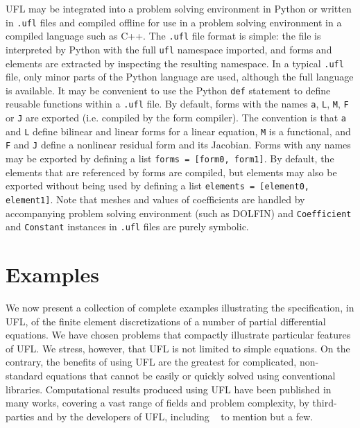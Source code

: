 \documentclass[prodmode,acmtoms]{acmsmall}
\newcommand{\uflc}[1]{\texttt{#1}}
\begin{document}
UFL may be integrated into a problem solving environment in Python or
written in \uflc{.ufl} files and compiled offline for use in a problem
solving environment in a compiled language such as C++.  The
\uflc{.ufl} file format is simple: the file is interpreted by Python
with the full \uflc{ufl} namespace imported, and forms and elements
are extracted by inspecting the resulting namespace.  In a typical
\uflc{.ufl} file, only minor parts of the Python language are used,
although the full language is available. It may be convenient to use
the Python \uflc{def} statement to define reusable functions within a
\uflc{.ufl} file. By default, forms with the names \uflc{a}, \uflc{L},
\uflc{M}, \uflc{F} or \uflc{J} are exported (i.e. compiled by the form
compiler).  The convention is that \uflc{a} and \uflc{L} define
bilinear and linear forms for a linear equation, \uflc{M} is a
functional, and \uflc{F} and \uflc{J} define a nonlinear residual form
and its Jacobian. Forms with any names may be exported by defining a
list \uflc{forms = [form0, form1]}. By default, the elements that are
referenced by forms are compiled, but elements may also be exported
without being used by defining a list \uflc{elements = [element0,
    element1]}.  Note that meshes and values of coefficients are
handled by accompanying problem solving environment (such as DOLFIN)
and \uflc{Coefficient} and \uflc{Constant} instances in \uflc{.ufl}
files are purely symbolic.

\section{Examples}
\label{sec:examples}

We now present a collection of complete examples illustrating the
specification, in UFL, of the finite element discretizations of a
number of partial differential equations. We have chosen problems that
compactly illustrate particular features of UFL. We stress, however,
that UFL is not limited to simple equations. On the contrary, the
benefits of using UFL are the greatest for complicated, non-standard
equations that cannot be easily or quickly solved using conventional
libraries. Computational results produced using UFL have been
published in many works, covering a vast range of fields and problem
complexity, by third-parties and by the developers of UFL, including
~\citep{abert2012numerical,arnold2012consistency,brandenburg2012advanced,brunner2012deterministic,FunkeFarrell2013,hake2012modelling,labeur:2012,fenics:book,maraldi:2011,mortensen:2011,rosseel:2012,wells:2011} to mention but a few.
\end{document}
